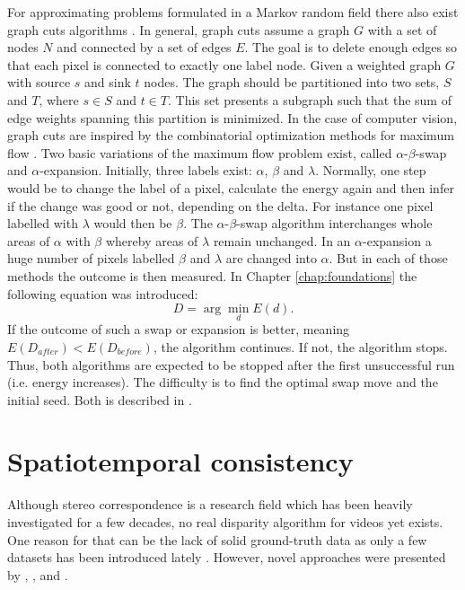 For approximating problems formulated in a Markov random field there also exist graph cuts algorithms \citep{boykov2001fast, cyganek2011introduction}.
In general, graph cuts assume a graph $G$ with a set of nodes $N$ and connected by a set of edges $E$.
The goal is to delete enough edges so that each pixel is connected to exactly one label node.
Given a weighted graph $G$ with source $s$ and sink $t$ nodes.
The graph should be partitioned into two sets, $S$ and $T$, where $s \in S$ and $t \in T$.
This set presents a subgraph such that the sum of edge weights spanning this partition is minimized.
\newline\newline\noindent In the case of computer vision, graph cuts are inspired by the combinatorial optimization methods for maximum flow \citep{cyganek2011introduction, cormen2009introduction}.
Two basic variations of the maximum flow problem exist, called $\alpha$-$\beta$-swap and $\alpha$-expansion.
Initially, three labels exist: $\alpha$, $\beta$ and $\lambda$. 
Normally, one step would be to change the label of a pixel, calculate the energy again and then infer if the change was good or not, depending on the delta.
For instance one pixel labelled with $\lambda$ would then be $\beta$.
The $\alpha$-$\beta$-swap algorithm interchanges whole areas of $\alpha$ with $\beta$ whereby areas of $\lambda$ remain unchanged.
In an $\alpha$-expansion a huge number of pixels labelled $\beta$ and $\lambda$ are changed into $\alpha$.
But in each of those methods the outcome is then measured.
In Chapter \ref{chap:foundations} the following equation was introduced:
\begin{equation}
  D = \arg\min_{d} E(d).
\end{equation}
\noindent If the outcome of such a swap or expansion is better, meaning $E(D_{after}) < E(D_{before})$, the algorithm continues.
If not, the algorithm stops.
Thus, both algorithms are expected to be stopped after the first unsuccessful run (i.e. energy increases).
The difficulty is to find the optimal swap move and the initial seed.
Both is described in \citep{boykov2001fast, sinha2004graph, tappen2003comparison, ramin2004energy}.

\section{Spatiotemporal consistency}

Although stereo correspondence is a research field which has been heavily investigated for a few decades, no real disparity algorithm for videos yet exists.
One reason for that can be the lack of solid ground-truth data as only a few datasets has been introduced lately \citep{Butler:ECCV:2012, scharstein2014high}.
However, novel approaches were presented by \citep{richardt2010real}, \citep{khoshabeh2011spatio}, \citep{lee2012local} and \citep{hosni2012temporally}.

